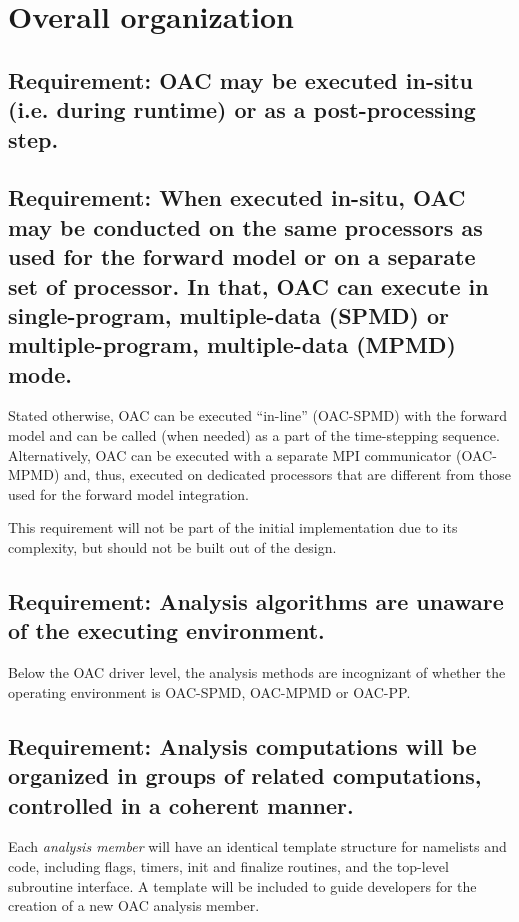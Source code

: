 \documentclass[11pt]{report}
\begin{document}
\section{Overall organization}
\subsection{{\color{green} Requirement:} OAC may be executed in-situ (i.e. during runtime) or as a post-processing step.}

\subsection{{\color{green} Requirement:} When executed in-situ, OAC may be conducted on the same processors as used for the forward model or on a separate set of processor. In that, OAC can execute in single-program, multiple-data (SPMD) or multiple-program, multiple-data (MPMD) mode. \label{requirement: modes}}
Stated otherwise, OAC can be executed ``in-line'' (OAC-SPMD) with the forward model and can be called (when needed) as a part of the time-stepping sequence. Alternatively, OAC can be executed with a separate MPI communicator (OAC-MPMD) and, thus, executed on dedicated processors that are different from those used for the forward model integration.

This requirement will not be part of the initial implementation due to its complexity, but should not be built out of the design.

\subsection{{\color{green} Requirement:} Analysis algorithms are unaware of the executing environment.}
Below the OAC driver level, the analysis methods are incognizant of whether the operating environment is OAC-SPMD, OAC-MPMD or OAC-PP.

\subsection{{\color{green} Requirement:} Analysis computations will be organized in groups of related computations, controlled in a coherent manner.}
Each {\it analysis member} will have an identical template structure for namelists and code, including flags, timers, init and finalize routines, and the top-level subroutine interface. A template will be included to guide developers for the creation of a new OAC analysis member.
\end{document}
